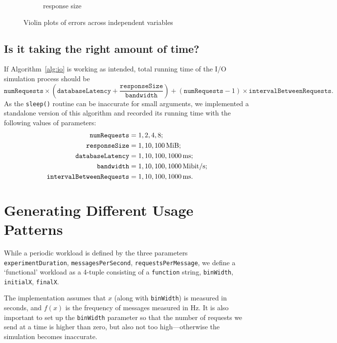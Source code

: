 \documentclass{article}
\begin{document}
\begin{figure}
\begin{subfigure}[t]{0.49\textwidth}
    \caption{response size}
    \label{fig:posterior_violin_response}
  \end{subfigure}
  \caption{Violin plots of errors across independent variables}
  \label{fig:posterior_violins}
\end{figure}

\subsection{Is it taking the right amount of time?}

If Algorithm~\ref{alg:io} is working as intended, total running time of the I/O
simulation process should be
\[
  \texttt{numRequests} \times \left( \texttt{databaseLatency} +
  \frac{\texttt{responseSize}}{\texttt{bandwidth}} \right) +
(\texttt{numRequests} - 1) \times \texttt{intervalBetweenRequests}.
\]
As the \texttt{sleep()} routine can be inaccurate for small arguments, we
implemented a standalone version of this algorithm and recorded its running time
with the following values of parameters:
\begin{align*}
  \texttt{numRequests} &= 1, 2, 4, 8; \\
  \texttt{responseSize} &= 1, 10, \SI{100}{\mebi\byte}; \\
  \texttt{databaseLatency} &= 1, 10, 100, \SI{1000}{\milli\second}; \\
  \texttt{bandwidth} &= 1, 10, 100, \SI[per-mode=symbol]{1000}{\mebi\bit\per\second}; \\
  \texttt{intervalBetweenRequests} &= 1, 10, 100, \SI{1000}{\milli\second}.
\end{align*}

\section{Generating Different Usage Patterns}


While a periodic workload is defined by the three parameters
\texttt{experimentDuration}, \texttt{messagesPerSecond},
\texttt{requestsPerMessage}, we define a `functional' workload as a 4-tuple
consisting of a \texttt{function} string, \texttt{binWidth}, \texttt{initialX},
\texttt{finalX}.

The implementation assumes that $x$ (along with \texttt{binWidth}) is measured
in seconds, and $f(x)$ is the frequency of messages measured in \si{\hertz}. It
is also important to set up the \texttt{binWidth} parameter so that the number
of requests we send at a time is higher than zero, but also not too
high---otherwise the simulation becomes inaccurate.
\end{document}
